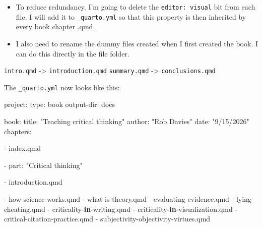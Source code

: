 \documentclass[
  letterpaper,
  DIV=11,
  numbers=noendperiod]{scrreprt}
\newenvironment{Shaded}{\begin{snugshade}}{\end{snugshade}}
\newcommand{\ControlFlowTok}[1]{\textcolor[rgb]{0.00,0.23,0.31}{\textbf{#1}}}
\newcommand{\NormalTok}[1]{\textcolor[rgb]{0.00,0.23,0.31}{#1}}
\newcommand{\SpecialCharTok}[1]{\textcolor[rgb]{0.37,0.37,0.37}{#1}}
\newcommand{\StringTok}[1]{\textcolor[rgb]{0.13,0.47,0.30}{#1}}
\begin{document}
\begin{itemize}
\item
  To reduce redundancy, I'm going to delete the \texttt{editor:\ visual}
  bit from each file. I will add it to \texttt{\_quarto.yml} so that
  this property is then inherited by every book chapter .qmd.
\item
  I also need to rename the dummy files created when I first created the
  book. I can do this directly in the file folder.
\end{itemize}

\texttt{intro.qmd} -\textgreater{} \texttt{introduction.qmd}
\texttt{summary.qmd} -\textgreater{} \texttt{conclusions.qmd}

The \texttt{\_quarto.yml} now looks like this:

\begin{Shaded}
\begin{Highlighting}[]
\NormalTok{project}\SpecialCharTok{:}
\NormalTok{  type}\SpecialCharTok{:}\NormalTok{ book}
\NormalTok{  output}\SpecialCharTok{{-}}\NormalTok{dir}\SpecialCharTok{:}\NormalTok{ docs}

\NormalTok{book}\SpecialCharTok{:}
\NormalTok{  title}\SpecialCharTok{:} \StringTok{"Teaching critical thinking"}
\NormalTok{  author}\SpecialCharTok{:} \StringTok{"Rob Davies"}
\NormalTok{  date}\SpecialCharTok{:} \StringTok{"9/15/2026"}
\NormalTok{  chapters}\SpecialCharTok{:}

    \SpecialCharTok{{-}}\NormalTok{ index.qmd}

    \SpecialCharTok{{-}}\NormalTok{ part}\SpecialCharTok{:} \StringTok{"Critical thinking"}

    \SpecialCharTok{{-}}\NormalTok{ introduction.qmd}

    \SpecialCharTok{{-}}\NormalTok{ how}\SpecialCharTok{{-}}\NormalTok{science}\SpecialCharTok{{-}}\NormalTok{works.qmd}
    \SpecialCharTok{{-}}\NormalTok{ what}\SpecialCharTok{{-}}\NormalTok{is}\SpecialCharTok{{-}}\NormalTok{theory.qmd}
    \SpecialCharTok{{-}}\NormalTok{ evaluating}\SpecialCharTok{{-}}\NormalTok{evidence.qmd}
    \SpecialCharTok{{-}}\NormalTok{ lying}\SpecialCharTok{{-}}\NormalTok{cheating.qmd}
    \SpecialCharTok{{-}}\NormalTok{ criticality}\SpecialCharTok{{-}}\ControlFlowTok{in}\SpecialCharTok{{-}}\NormalTok{writing.qmd}
    \SpecialCharTok{{-}}\NormalTok{ criticality}\SpecialCharTok{{-}}\ControlFlowTok{in}\SpecialCharTok{{-}}\NormalTok{visualization.qmd}
    \SpecialCharTok{{-}}\NormalTok{ critical}\SpecialCharTok{{-}}\NormalTok{citation}\SpecialCharTok{{-}}\NormalTok{practice.qmd}
    \SpecialCharTok{{-}}\NormalTok{ subjectivity}\SpecialCharTok{{-}}\NormalTok{objectivity}\SpecialCharTok{{-}}\NormalTok{virtues.qmd}


\end{Highlighting}
\end{Shaded}
\end{document}
